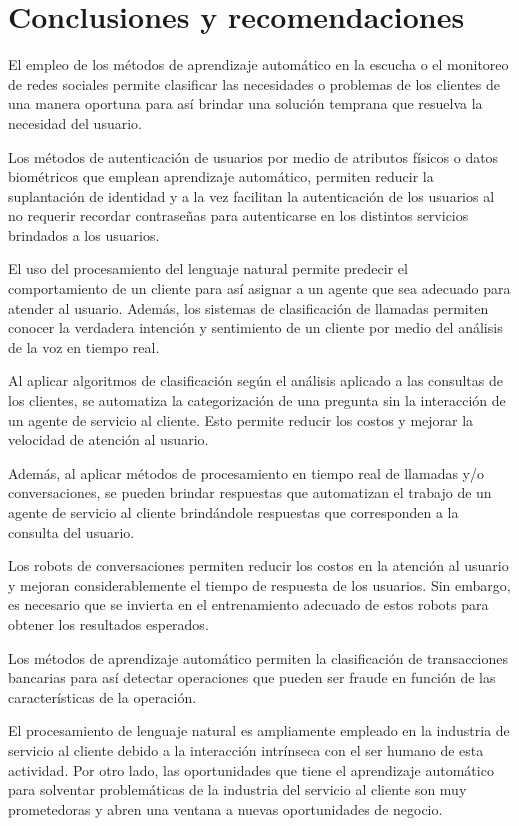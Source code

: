\documentclass[conference]{IEEEtran}
\begin{document}
\section{Conclusiones y recomendaciones}

El empleo de los métodos de aprendizaje automático en la escucha o el monitoreo de redes sociales permite clasificar las necesidades o problemas de los clientes de una manera oportuna para así brindar una solución temprana que resuelva la necesidad del usuario.

Los métodos de autenticación de usuarios por medio de atributos físicos o datos biométricos que emplean aprendizaje automático, permiten reducir la suplantación de identidad y a la vez facilitan la autenticación de los usuarios al no requerir recordar contraseñas para autenticarse en los distintos servicios brindados a los usuarios.

El uso del procesamiento del lenguaje natural permite predecir el comportamiento de un cliente para así asignar a un agente que sea adecuado para atender al usuario. Además, los sistemas de clasificación de llamadas permiten conocer la verdadera intención y sentimiento de un cliente por medio del análisis de la voz en tiempo real.

Al aplicar algoritmos de clasificación según el análisis aplicado a las consultas de los clientes, se automatiza la categorización de una pregunta sin la interacción de un agente de servicio al cliente. Esto permite reducir los costos y mejorar la velocidad de atención al usuario.

Además, al aplicar métodos de procesamiento en tiempo real de llamadas y/o conversaciones, se pueden brindar respuestas que automatizan el trabajo de un agente de servicio al cliente brindándole respuestas que corresponden a la consulta del usuario.

Los robots de conversaciones permiten reducir los costos en la atención al usuario y mejoran considerablemente el tiempo de respuesta de los usuarios. Sin embargo, es necesario que se invierta en el entrenamiento adecuado de estos robots para obtener los resultados esperados.

Los métodos de aprendizaje automático permiten la clasificación de transacciones bancarias para así detectar operaciones que pueden ser fraude en función de las características de la operación.

El procesamiento de lenguaje natural es ampliamente empleado en la industria de servicio al cliente debido a la interacción intrínseca con el ser humano de esta actividad.
Por otro lado, las oportunidades que tiene el aprendizaje automático para solventar problemáticas de la industria del servicio al cliente son muy prometedoras y abren una ventana a nuevas oportunidades de negocio.



\end{document}
